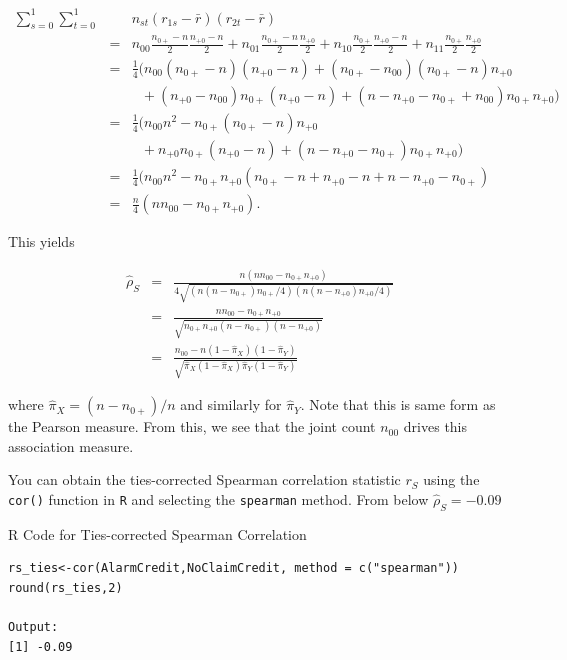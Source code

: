 \documentclass[]{book}
\theoremstyle{definition}
\theoremstyle{definition}
\theoremstyle{definition}
\theoremstyle{remark}
\begin{document}
\begin{eqnarray*}
\sum_{s=0}^{1}  \sum_{t=0}^{1} && n_{st}(r_{1s} - \bar{r})(r_{2t} - \bar{r})\\
&=& n_{00} \frac{n_{0+}-n}{2} \frac{n_{+0}-n}{2}
+n_{01} \frac{n_{0+}-n}{2} \frac{n_{+0}}{2}
+n_{10} \frac{n_{0+}}{2} \frac{n_{+0}-n}{2}
+n_{11} \frac{n_{0+}}{2} \frac{n_{+0}}{2} \\
&=& \frac{1}{4}(n_{00} (n_{0+}-n) (n_{+0}-n)
+(n_{0+}-n_{00}) (n_{0+}-n)n_{+0} \\
&&  ~ ~ ~ +(n_{+0}-n_{00})  n_{0+}(n_{+0}-n)
+(n-n_{+0}-n_{0+}+n_{00}) n_{0+}n_{+0} ) \\
&=& \frac{1}{4}(n_{00} n^2
- n_{0+} (n_{0+}-n)n_{+0} \\
&& ~ ~ ~ +n_{+0}  n_{0+}(n_{+0}-n)
+(n-n_{+0}-n_{0+}) n_{0+}n_{+0} ) \\
&=& \frac{1}{4}(n_{00} n^2
- n_{0+}n_{+0} (n_{0+}-n +n_{+0}-n
+n-n_{+0}-n_{0+}) \\
&=& \frac{n}{4}(n n_{00} - n_{0+}n_{+0}) .
\end{eqnarray*}

This yields

\begin{eqnarray*}
\hat{\rho}_S &=& \frac{n(n n_{00} - n_{0+}n_{+0})}
{4\sqrt{(n (n-n_{0+})n_{0+}/4)(n (n-n_{+0})n_{+0}/4)}} \\
&=& \frac{n n_{00} - n_{0+}n_{+0}}
{\sqrt{ n_{0+} n_{+0}(n-n_{0+}) (n-n_{+0})}} \\
&=& \frac{n_{00} - n (1-\hat{\pi}_X)(1- \hat{\pi}_Y)}
{\sqrt{\hat{\pi}_X(1-\hat{\pi}_X)\hat{\pi}_Y(1-\hat{\pi}_Y) }}
\end{eqnarray*}

where \(\hat{\pi}_X = (n-n_{0+})/n\) and similarly for \(\hat{\pi}_Y\).
Note that this is same form as the Pearson measure. From this, we see
that the joint count \(n_{00}\) drives this association measure.

\bigskip

You can obtain the ties-corrected Spearman correlation statistic \(r_S\)
using the \texttt{cor()} function in \texttt{R} and selecting the
\texttt{spearman} method. From below \(\hat{\rho}_S=-0.09\)

R Code for Ties-corrected Spearman Correlation

\hypertarget{display.spearT.2}{}
\begin{verbatim}
rs_ties<-cor(AlarmCredit,NoClaimCredit, method = c("spearman"))
round(rs_ties,2)

Output:
[1] -0.09
\end{verbatim}
\end{document}
